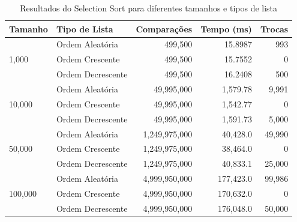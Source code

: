 \documentclass[tcc1,project]{uftex}
\begin{document}
\begin{table}[h]
\centering
\caption{Resultados do Selection Sort para diferentes tamanhos e tipos de lista}
\begin{tabular}{llrrr}
\toprule
\textbf{Tamanho} & \textbf{Tipo de Lista} & \textbf{Comparações} & \textbf{Tempo (ms)} & \textbf{Trocas} \\
\midrule
\multirow{3}{*}{1,000}   & Ordem Aleatória   & 499,500  & 15.8987   & 993 \\
                         & Ordem Crescente   & 499,500  & 15.7552   & 0 \\
                         & Ordem Decrescente & 499,500  & 16.2408   & 500 \\
\midrule
\multirow{3}{*}{10,000}  & Ordem Aleatória   & 49,995,000  & 1,579.78   & 9,991 \\
                         & Ordem Crescente   & 49,995,000  & 1,542.77   & 0 \\
                         & Ordem Decrescente & 49,995,000  & 1,591.73   & 5,000 \\
\midrule
\multirow{3}{*}{50,000}  & Ordem Aleatória   & 1,249,975,000  & 40,428.0  & 49,990 \\
                         & Ordem Crescente   & 1,249,975,000  & 38,464.0  & 0 \\
                         & Ordem Decrescente & 1,249,975,000  & 40,833.1  & 25,000 \\
\midrule
\multirow{3}{*}{100,000} & Ordem Aleatória   & 4,999,950,000  & 177,423.0 & 99,986 \\
                         & Ordem Crescente   & 4,999,950,000  & 170,632.0 & 0 \\
                         & Ordem Decrescente & 4,999,950,000  & 176,048.0 & 50,000 \\
\bottomrule
\end{tabular}
\end{table}
\end{document}
